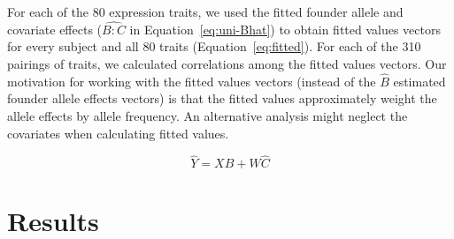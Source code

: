 \documentclass{article}
\begin{document}
For each of the 80 expression traits, we used the fitted founder allele and covariate effects ($\widehat{B:C}$ in Equation~\ref{eq:uni-Bhat}) to obtain fitted values vectors for every subject and all 80 traits (Equation~\ref{eq:fitted}). For each of the 310 pairings of traits, we calculated correlations among the fitted values vectors. Our motivation for working with the fitted values vectors (instead of the $\hat B$ estimated founder allele effects vectors) is that the fitted values approximately weight the allele effects by allele frequency. An alternative analysis might neglect the covariates when calculating fitted values.

\begin{equation}\label{eq:fitted}
\hat Y = X\hat B + W \hat C
\end{equation}


\section{Results}
\end{document}
